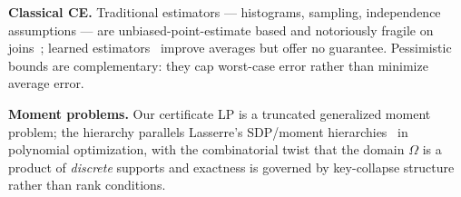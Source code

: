 \textbf{Classical CE.}
Traditional estimators --- histograms, sampling, independence
assumptions --- are unbiased-point-estimate based and notoriously
fragile on joins~\cite{leis2015howgood,leis2018query}; learned
estimators~\cite{han2021cardinality} improve averages but offer no
guarantee.  Pessimistic bounds are complementary: they cap worst-case
error rather than minimize average error.

\textbf{Moment problems.}
Our certificate LP is a truncated generalized moment problem; the
hierarchy parallels Lasserre's SDP/moment
hierarchies~\cite{lasserre2001} in polynomial optimization, with the
combinatorial twist that the domain $\Omega$ is a product of
\emph{discrete} supports and exactness is governed by key-collapse
structure rather than rank conditions.
